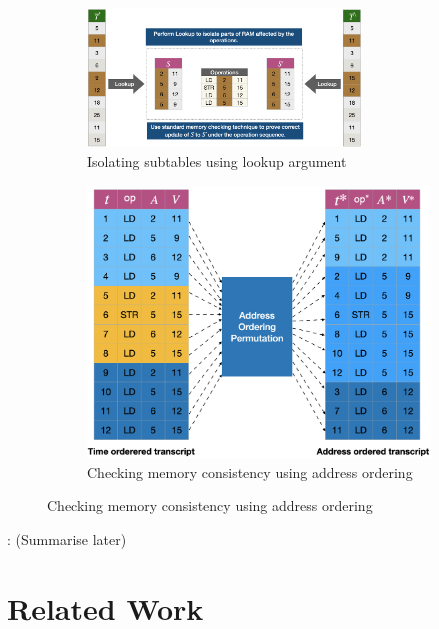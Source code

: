 \documentclass[11pt]{article}
\begin{document}
    \begin{figure}[t]
    \begin{subfigure}{\textwidth}
    \centering
    \includegraphics[width=0.8\textwidth]{example-lookup}
    \caption{Isolating subtables using lookup argument}
    \label{fig:subtable-consistency}
    \end{subfigure}
    \begin{subfigure}{\textwidth}
    \centering
        \includegraphics[height=0.3\textheight]{Address-ordered}
        \caption{Checking memory consistency using address ordering}
        \label{fig:permuted-transcripts}
    \end{subfigure}
    \end{figure}


    : (Summarise later)

    \section{Related Work}\label{sec:rel-work}
    
\end{document}
